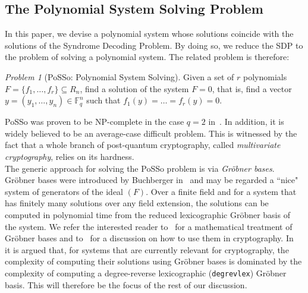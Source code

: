 \documentclass[11pt]{article}
\newcommand{\Fq}[0]{\mathbb{F}_q}
\theoremstyle{plain}
\theoremstyle{definition}
\theoremstyle{remark}
\newtheorem{prob}{Problem}
\begin{document}
\subsection{The Polynomial System Solving Problem}\label{sec:posso}
In this paper, we devise a polynomial system whose solutions coincide with the solutions of the Syndrome Decoding Problem. By doing so, we reduce the SDP to the problem of solving a polynomial system. The related problem is therefore:
\begin{prob}[PoSSo: Polynomial System Solving]
    Given a set of $r$ polynomials $F=\{f_1,\dots,f_r\}\subseteq R_n$, find a solution of the system $F=0$, that is, find a vector $y=(y_1,\dots,y_n)\in\Fq^n$ such that $f_1(y)=\dots=f_r(y)=0$.
\end{prob}
PoSSo was proven to be NP-complete in the case $q=2$ in~\cite[28]{FRAENKEL197915}. In addition, it is widely believed to be an average-case difficult problem. This is witnessed by the fact that a whole branch of post-quantum cryptography, called \textit{multivariate cryptography}, relies on its hardness. \\

The generic approach for solving the PoSSo problem is via \textit{Gr\"obner bases}. Gr\"obner bases were introduced by Buchberger in~\cite{BUCHBERGER2006475} and may be regarded a ``nice" system of generators of the ideal $(F)$. Over a finite field and for a system that has finitely many solutions over any field extension, the solutions can be computed in polynomial time from the reduced lexicographic Gr\"obner basis of the system. We refer the interested reader to~\cite{kreuzerrobbiano2000} for a mathematical treatment of Gr\"obner bases and to~\cite{Caminata_2021} for a discussion on how to use them in cryptography. 
In~\cite{Caminata_2021} it is argued that, for systems that are currently relevant for cryptography, the complexity of computing their solutions using Gr\"obner bases is dominated by the complexity of computing a degree-reverse lexicographic (\texttt{degrevlex}) Gr\"obner basis. This will therefore be the focus of the rest of our discussion.
\end{document}
